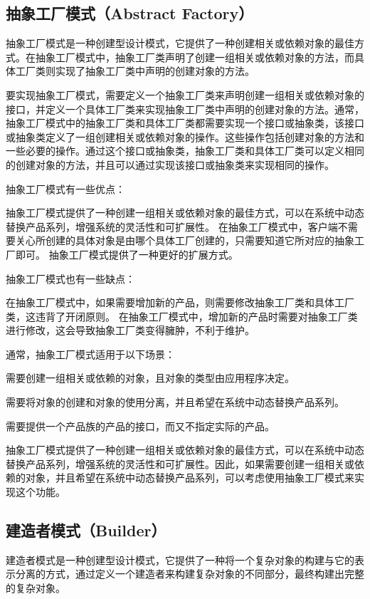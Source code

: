 \documentclass[cn,black,12pt,normal]{elegantnote}
\begin{document}
\subsection{抽象工厂模式（Abstract Factory）}

抽象工厂模式是一种创建型设计模式，它提供了一种创建相关或依赖对象的最佳方式。在抽象工厂模式中，抽象工厂类声明了创建一组相关或依赖对象的方法，而具体工厂类则实现了抽象工厂类中声明的创建对象的方法。

要实现抽象工厂模式，需要定义一个抽象工厂类来声明创建一组相关或依赖对象的接口，并定义一个具体工厂类来实现抽象工厂类中声明的创建对象的方法。通常，抽象工厂模式中的抽象工厂类和具体工厂类都需要实现一个接口或抽象类，该接口或抽象类定义了一组创建相关或依赖对象的操作。这些操作包括创建对象的方法和一些必要的操作。通过这个接口或抽象类，抽象工厂类和具体工厂类可以定义相同的创建对象的方法，并且可以通过实现该接口或抽象类来实现相同的操作。

抽象工厂模式有一些优点：

抽象工厂模式提供了一种创建一组相关或依赖对象的最佳方式，可以在系统中动态替换产品系列，增强系统的灵活性和可扩展性。
在抽象工厂模式中，客户端不需要关心所创建的具体对象是由哪个具体工厂创建的，只需要知道它所对应的抽象工厂即可。
抽象工厂模式提供了一种更好的扩展方式。

抽象工厂模式也有一些缺点：

在抽象工厂模式中，如果需要增加新的产品，则需要修改抽象工厂类和具体工厂类，这违背了开闭原则。
在抽象工厂模式中，增加新的产品时需要对抽象工厂类进行修改，这会导致抽象工厂类变得臃肿，不利于维护。

通常，抽象工厂模式适用于以下场景：

需要创建一组相关或依赖的对象，且对象的类型由应用程序决定。

需要将对象的创建和对象的使用分离，并且希望在系统中动态替换产品系列。

需要提供一个产品族的产品的接口，而又不指定实际的产品。

抽象工厂模式提供了一种创建一组相关或依赖对象的最佳方式，可以在系统中动态替换产品系列，增强系统的灵活性和可扩展性。因此，如果需要创建一组相关或依赖的对象，并且希望在系统中动态替换产品系列，可以考虑使用抽象工厂模式来实现这个功能。

\subsection{建造者模式（Builder）}

建造者模式是一种创建型设计模式，它提供了一种将一个复杂对象的构建与它的表示分离的方式，通过定义一个建造者来构建复杂对象的不同部分，最终构建出完整的复杂对象。
\end{document}
